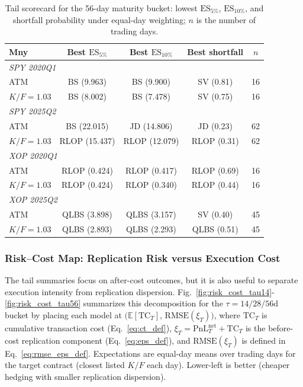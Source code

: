 \begin{table}[t]
\centering
\footnotesize
\setlength{\tabcolsep}{3.5pt}
\renewcommand{\arraystretch}{0.98}
\begin{tabular}{lcccc}
\toprule
Mny & Best $\mathrm{ES}_{5\%}$ & Best $\mathrm{ES}_{10\%}$ & Best shortfall & $n$ \\
\midrule
\multicolumn{5}{l}{\textit{SPY 2020Q1}} \\
ATM        & BS (9.963)    & BS (9.900)    & SV (0.81)   & 16 \\
$K/F=1.03$ & BS (8.002)    & BS (7.478)    & SV (0.75)   & 16 \\
\midrule
\multicolumn{5}{l}{\textit{SPY 2025Q2}} \\
ATM        & BS (22.015)   & JD (14.806)   & JD (0.23)   & 62 \\
$K/F=1.03$ & RLOP (15.437) & RLOP (12.079) & RLOP (0.31) & 62 \\
\midrule
\multicolumn{5}{l}{\textit{XOP 2020Q1}} \\
ATM        & RLOP (0.424)  & RLOP (0.417)  & RLOP (0.69) & 16 \\
$K/F=1.03$ & RLOP (0.424)  & RLOP (0.340)  & RLOP (0.44) & 16 \\
\midrule
\multicolumn{5}{l}{\textit{XOP 2025Q2}} \\
ATM        & QLBS (3.898)  & QLBS (3.157)  & SV (0.40)   & 45 \\
$K/F=1.03$ & QLBS (2.893)  & QLBS (2.293)  & QLBS (0.51) & 45 \\
\bottomrule
\end{tabular}
\caption{Tail scorecard for the 56-day maturity bucket: lowest $\mathrm{ES}_{5\%}$, $\mathrm{ES}_{10\%}$, and shortfall probability under equal-day weighting; $n$ is the number of trading days.}
\label{tab:scorecard_56d}
\end{table}


\subsubsection{Risk--Cost Map: Replication Risk versus Execution Cost}
\label{subsubsec:risk_cost_map}

The tail summaries focus on after-cost outcomes, but it is also useful to separate execution intensity from replication dispersion.
Fig.~\ref{fig:risk_cost_tau14}-\ref{fig:risk_cost_tau56} summarizes this decomposition for the $\tau=14/28/56$d bucket by placing each model at
$\bigl(\mathbb{E}[\mathrm{TC}_T],\,\mathrm{RMSE}(\xi_T)\bigr)$, where $\mathrm{TC}_T$ is cumulative transaction cost (Eq.~\eqref{eq:ct_def}),
$\xi_T=\mathrm{PnL}_T^{\mathrm{net}}+\mathrm{TC}_T$ is the before-cost replication component (Eq.~\eqref{eq:eps_def}),
and $\mathrm{RMSE}(\xi_T)$ is defined in Eq.~\eqref{eq:rmse_eps_def}.
Expectations are equal-day means over trading days for the target contract (closest listed $K/F$ each day).
Lower-left is better (cheaper hedging with smaller replication dispersion).

